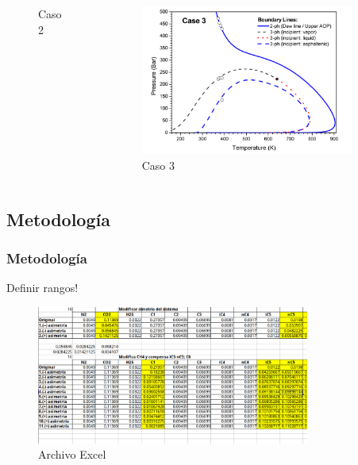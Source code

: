 \documentclass[aspectratio=1610,multi,rgb]{beamer}
\begin{document}
\begin{frame}[c]
\begin{columns}
\begin{figure}[htpb]
            \caption{Caso 2}
            \label{fig:case2}
        \end{figure}
        \begin{figure}[htpb]
            \centering
            \includegraphics[width=0.9\textwidth]{figs/case3.png}
            \caption{Caso 3}
            \label{fig:case3}
        \end{figure}
    \end{columns}
\end{frame}

\subsection{Metodología}\label{met}
\begin{frame}[c]
    \frametitle{Metodología}

    Definir rangos!


    \begin{figure}[htpb]
        \centering
        \includegraphics[width=0.8\textwidth]{figs/excel.png}
        \caption{Archivo Excel}
        \label{fig:figs-excel-png}
    \end{figure}
\end{frame}
\end{document}
